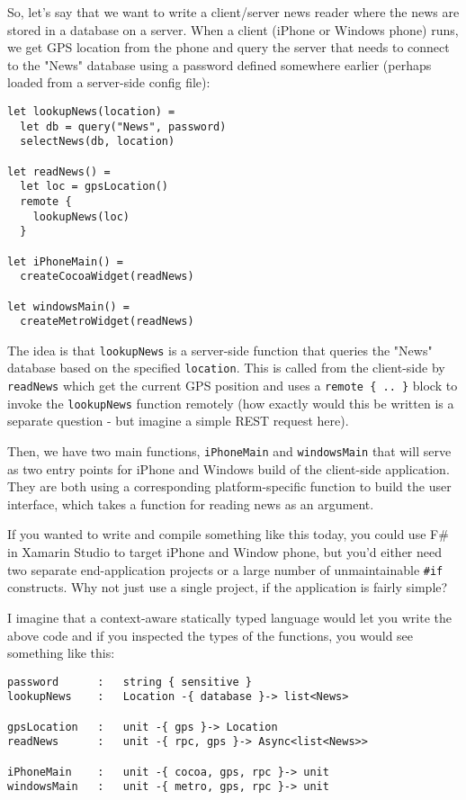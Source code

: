 So, let's say that we want to write a client/server news reader where the news are stored in a 
database on a server. When a client (iPhone or Windows phone) runs, we get GPS location from the
phone and query the server that needs to connect to the "News" database using a password defined
somewhere earlier (perhaps loaded from a server-side config file):

\begin{verbatim}
let lookupNews(location) =
  let db = query("News", password)
  selectNews(db, location)  

let readNews() =
  let loc = gpsLocation()       
  remote { 
    lookupNews(loc) 
  } 

let iPhoneMain() =
  createCocoaWidget(readNews)

let windowsMain() =    
  createMetroWidget(readNews)
\end{verbatim}

The idea is that \texttt{lookupNews} is a server-side function that queries the "News" database based on 
the specified \texttt{location}. This is called from the client-side by \texttt{readNews} which get the current GPS
position and uses a \texttt{remote \{ .. \}} block to invoke the \texttt{lookupNews} function remotely (how exactly would
this be written is a separate question - but imagine a simple REST request here).

Then, we have two main functions, \texttt{iPhoneMain} and \texttt{windowsMain} that will serve as two entry points
for iPhone and Windows build of the client-side application. They are both using a corresponding
platform-specific function to build the user interface, which takes a function for reading news as an
argument.

If you wanted to write and compile something like this today, you could use F\# in Xamarin 
Studio to target iPhone and Window phone, but you'd either need two separate end-application projects 
or a large number of unmaintainable \texttt{\#if} constructs. Why not just use a single project, if 
the application is fairly simple?

I imagine that a context-aware statically typed language would let you write the above code and 
if you inspected the types of the functions, you would see something like this:

\begin{verbatim}
password      :   string { sensitive }
lookupNews    :   Location -{ database }-> list<News> 

gpsLocation   :   unit -{ gps }-> Location 
readNews      :   unit -{ rpc, gps }-> Async<list<News>> 

iPhoneMain    :   unit -{ cocoa, gps, rpc }-> unit 
windowsMain   :   unit -{ metro, gps, rpc }-> unit 
\end{verbatim}

